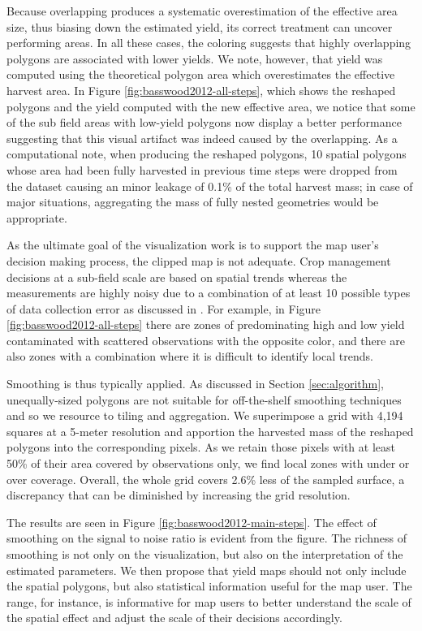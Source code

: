  Because overlapping produces a systematic
overestimation of the effective area size, thus biasing down the
estimated yield, its correct treatment can uncover performing
areas. In all these cases, the coloring suggests that highly
overlapping polygons are associated with lower yields. We note,
however, that yield was computed using the theoretical polygon area
which overestimates the effective harvest area. In Figure
\ref{fig:basswood2012-all-steps}, which shows the reshaped polygons
and the yield computed with the new effective area, we notice that
some of the sub field areas with low-yield polygons now display a
better performance suggesting that this visual artifact was indeed
caused by the overlapping. As a computational note, when producing the
reshaped polygons, 10 spatial polygons whose area had been fully
harvested in previous time steps were dropped from the dataset causing
an minor leakage of 0.1\% of the total harvest mass; in case of major
situations, aggregating the mass of fully nested geometries would be
appropriate.

 As the ultimate goal of the visualization
work is to support the map user's decision making process, the clipped
map is not adequate. Crop management decisions at a sub-field scale
are based on spatial trends whereas the measurements are highly noisy
due to a combination of at least 10 possible types of data collection
error as discussed in \cite{Lyle2013}. For example, in Figure
\ref{fig:basswood2012-all-steps} there are zones of predominating high
and low yield contaminated with scattered observations with the
opposite color, and there are also zones with a combination where it
is difficult to identify local trends.

 Smoothing is thus
typically applied. As discussed in Section \ref{sec:algorithm},
unequally-sized polygons are not suitable for off-the-shelf smoothing
techniques and so we resource to tiling and aggregation. We
superimpose a grid with 4,194 squares at a 5-meter resolution and
apportion the harvested mass of the reshaped polygons into the
corresponding pixels. As we retain those pixels with at least 50\% of
their area covered by observations only, we find local zones with
under or over coverage. Overall, the whole grid covers 2.6\% less of
the sampled surface, a discrepancy that can be diminished by
increasing the grid resolution.

 The results are seen in Figure
\ref{fig:basswood2012-main-steps}. The effect of smoothing on the
signal to noise ratio is evident from the figure. The richness of
smoothing is not only on the visualization, but also on the
interpretation of the estimated parameters. We then propose that yield
maps should not only include the spatial polygons, but also
statistical information useful for the map user. The range, for
instance, is informative for map users to better understand the scale
of the spatial effect and adjust the scale of their decisions
accordingly. %

